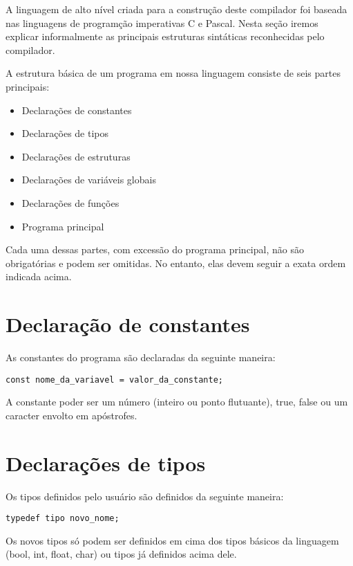 
  A linguagem de alto nível criada para a construção deste compilador foi baseada nas linguagens de programção imperativas C e Pascal. Nesta seção iremos explicar informalmente as principais estruturas sintáticas reconhecidas pelo compilador.

  A estrutura básica de um programa em nossa linguagem consiste de seis partes principais:

  \begin{itemize}
    \item Declarações de constantes
    \item Declarações de tipos
    \item Declarações de estruturas
    \item Declarações de variáveis globais
    \item Declarações de funções
    \item Programa principal
  \end{itemize}

  Cada uma dessas partes, com excessão do programa principal, não são obrigatórias e podem ser omitidas. No entanto, elas devem seguir a exata ordem indicada acima.

  \section{Declaração de constantes}

  As constantes do programa são declaradas da seguinte maneira:

\begin{lstlisting}
const nome_da_variavel = valor_da_constante;
\end{lstlisting}

  A constante poder ser um número (inteiro ou ponto flutuante), true, false ou um caracter envolto em apóstrofes.

  \section{Declarações de tipos}

  Os tipos definidos pelo usuário são definidos da seguinte maneira:

\begin{lstlisting}
typedef tipo novo_nome;
\end{lstlisting}

  Os novos tipos só podem ser definidos em cima dos tipos básicos da linguagem (bool, int, float, char) ou tipos já definidos acima dele.

